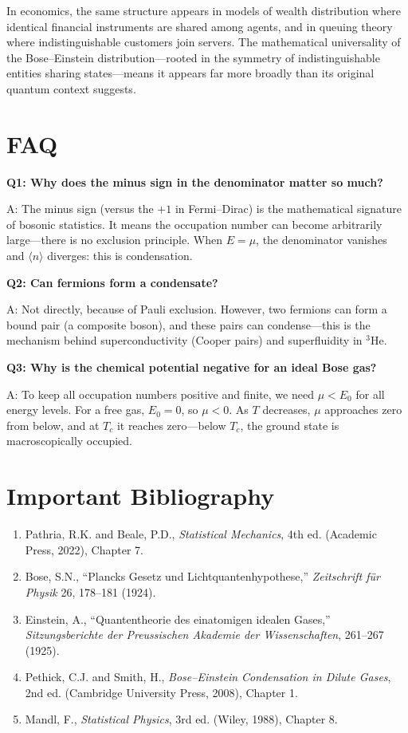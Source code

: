 In economics, the same structure appears in models of wealth distribution where identical financial instruments are shared among agents, and in queuing theory where indistinguishable customers join servers. The mathematical universality of the Bose--Einstein distribution---rooted in the symmetry of indistinguishable entities sharing states---means it appears far more broadly than its original quantum context suggests.


\section*{FAQ}

\textbf{Q1: Why does the minus sign in the denominator matter so much?}

A: The minus sign (versus the $+1$ in Fermi--Dirac) is the mathematical signature of bosonic statistics. It means the occupation number can become arbitrarily large---there is no exclusion principle. When $E = \mu$, the denominator vanishes and $\langle n \rangle$ diverges: this is condensation.

\textbf{Q2: Can fermions form a condensate?}

A: Not directly, because of Pauli exclusion. However, two fermions can form a bound pair (a composite boson), and these pairs can condense---this is the mechanism behind superconductivity (Cooper pairs) and superfluidity in $^3$He.

\textbf{Q3: Why is the chemical potential negative for an ideal Bose gas?}

A: To keep all occupation numbers positive and finite, we need $\mu < E_0$ for all energy levels. For a free gas, $E_0 = 0$, so $\mu < 0$. As $T$ decreases, $\mu$ approaches zero from below, and at $T_c$ it reaches zero---below $T_c$, the ground state is macroscopically occupied.
\section*{Important Bibliography}

\begin{enumerate}
\item Pathria, R.K. and Beale, P.D., \textit{Statistical Mechanics}, 4th ed. (Academic Press, 2022), Chapter 7.
\item Bose, S.N., ``Plancks Gesetz und Lichtquantenhypothese,'' \textit{Zeitschrift f\"ur Physik} 26, 178--181 (1924).
\item Einstein, A., ``Quantentheorie des einatomigen idealen Gases,'' \textit{Sitzungsberichte der Preussischen Akademie der Wissenschaften}, 261--267 (1925).
\item Pethick, C.J. and Smith, H., \textit{Bose--Einstein Condensation in Dilute Gases}, 2nd ed. (Cambridge University Press, 2008), Chapter 1.
\item Mandl, F., \textit{Statistical Physics}, 3rd ed. (Wiley, 1988), Chapter 8.
\end{enumerate}



